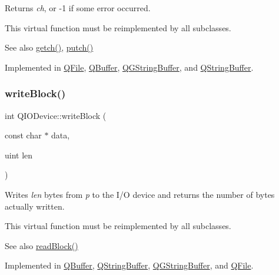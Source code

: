 Returns {\itshape ch}, or -\/1 if some error occurred.

This virtual function must be reimplemented by all subclasses.

\begin{DoxySeeAlso}{See also}
\mbox{\hyperlink{class_q_i_o_device_a7cef61d66023f9cda6b0912082bd19fc}{getch()}}, \mbox{\hyperlink{class_q_i_o_device_a5de5c1c1cba7ca36ba93289e30cd3029}{putch()}} 
\end{DoxySeeAlso}


Implemented in \mbox{\hyperlink{class_q_file_afb01a04cda09b3cc61babb5d334a052c}{Q\+File}}, \mbox{\hyperlink{class_q_buffer_a52f9ebc674d0651e6fd89e148529bb50}{Q\+Buffer}}, \mbox{\hyperlink{class_q_g_string_buffer_a6e97e3b078054bdeb5ee62d6970e7863}{Q\+G\+String\+Buffer}}, and \mbox{\hyperlink{class_q_string_buffer_ad6e53fb9f2f2969b9f9a7a1daa2d7af2}{Q\+String\+Buffer}}.

\mbox{\label{class_q_i_o_device_a5d937df1bde2f956872dd54e077807d1}} 
\subsubsection{\texorpdfstring{writeBlock()}{writeBlock()}\hspace{0.1cm}{\footnotesize\ttfamily [1/2]}}
{\footnotesize\ttfamily int Q\+I\+O\+Device\+::write\+Block (\begin{DoxyParamCaption}\item[{const char $\ast$}]{data,  }\item[{uint}]{len }\end{DoxyParamCaption})\hspace{0.3cm}{\ttfamily [pure virtual]}}

Writes {\itshape len} bytes from {\itshape p} to the I/O device and returns the number of bytes actually written.

This virtual function must be reimplemented by all subclasses.

\begin{DoxySeeAlso}{See also}
\mbox{\hyperlink{class_q_i_o_device_a71f10647e4bd98141f45362b9a06983a}{read\+Block()}} 
\end{DoxySeeAlso}


Implemented in \mbox{\hyperlink{class_q_buffer_ad8bdac07e525a782d0759d3082bb296a}{Q\+Buffer}}, \mbox{\hyperlink{class_q_string_buffer_a4c17bf2b2702b837ba614bd92ad0d7a2}{Q\+String\+Buffer}}, \mbox{\hyperlink{class_q_g_string_buffer_aab6c9a7bfbc048b4adff01f4bf920efa}{Q\+G\+String\+Buffer}}, and \mbox{\hyperlink{class_q_file_a47e0572e396a6e953d14ba69bf733cea}{Q\+File}}.

